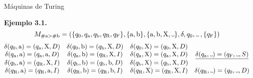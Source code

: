 \documentclass[10pt,xcolor=dvipsnames,aspectratio=169,spanish]{beamer}
\newcommand\Vtextvisiblespace[1][.3em]{%
\mbox{\kern.06em\vrule height.3ex}%
\vbox{\hrule width#1}%
\hbox{\vrule height.3ex}}
\begin{document}
\begin{frame}{Máquinas de Turing}

\textbf{Ejemplo 3.1}\textbf{.}
$$
    M_{\#\text{a}>\#\text{b}}=(\{q_0, q_\text{a}, q_\text{b}, q_\text{R}, q_\text{F}\}, \{\text{a}, \text{b}\}, \{\text{a}, \text{b}, \text{X}, \Vtextvisiblespace\}, \delta, q_0, \Vtextvisiblespace\:,\{q_\text{F}\})
$$
$$
    \begin{matrix}
        \delta(q_0, \text{a}) = (q_\text{a},\text{X},D) & \delta(q_0, \text{b}) = (q_\text{b},\text{X},D) & \delta(q_0, \text{X}) = (q_0,\text{X},D) &  \\
        \delta(q_\text{a}, \text{a}) = (q_\text{a},\text{a},D) & \delta(q_\text{a}, \text{b}) = (q_\text{R},\text{X},I) & \delta(q_\text{a}, \text{X}) = (q_\text{a},\text{X},D) & \underline{\delta(q_\text{a}, \Vtextvisiblespace) = (q_\text{F},\Vtextvisiblespace,S)} \\
        \delta(q_\text{b}, \text{a}) = (q_\text{R},\text{X},I) & \delta(q_\text{b}, \text{b}) = (q_\text{b},\text{b},D) & \delta(q_\text{b}, \text{X}) = (q_\text{b},\text{X},D) &  \\
        \delta(q_\text{R}, \text{a}) = (q_\text{R},\text{a},I) & \delta(q_\text{R}, \text{b}) = (q_\text{R},\text{b},I) & \delta(q_\text{R}, \text{X}) = (q_\text{R},\text{X},I) & \delta(q_\text{R}, \Vtextvisiblespace) = (q_0,\Vtextvisiblespace,D) \\
    \end{matrix}
$$

\vspace{5mm}

\begin{adjustbox}{max height={.67\textheight},center}

\end{adjustbox}

\end{frame}
\end{document}
